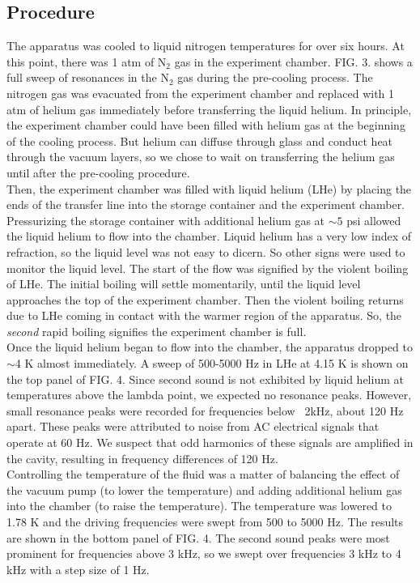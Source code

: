 \documentclass[prb,aps,twocolumn,showpacs,10pt]{revtex4-1}
\begin{document}
\subsection{Procedure}

The apparatus was cooled to liquid nitrogen temperatures for over six hours. At this point, there was 1 atm of N$_2$ gas in the experiment chamber. FIG. 3. shows a full sweep of resonances in the N$_2$ gas during the pre-cooling process. The nitrogen gas was evacuated from the experiment chamber and replaced with 1 atm of helium gas immediately before transferring the liquid helium. In principle, the experiment chamber could have been filled with helium gas at the beginning of the cooling process. But helium can diffuse through glass and conduct heat through the vacuum layers, so we chose to wait on transferring the helium gas until after the pre-cooling procedure.\\


Then, the experiment chamber was filled with liquid helium (LHe) by placing the ends of the transfer line into the storage container and the experiment chamber. Pressurizing the storage container with additional helium gas at $\sim 5$ psi allowed the liquid helium to flow into the chamber. Liquid helium has a very low index of refraction, so the liquid level was not easy to dicern. So other signs were used to monitor the liquid level. The start of the flow was signified by the violent boiling of LHe.  The initial boiling will settle momentarily, until the liquid level approaches the top of the experiment chamber. Then the violent boiling returns due to LHe coming in contact with the warmer region of the apparatus. So, the \textit{second} rapid boiling signifies the experiment chamber is full. \\

Once the liquid helium began to flow into the chamber, the apparatus dropped to $\sim$4 K almost immediately. A sweep of 500-5000 Hz in LHe at 4.15 K is shown on the top panel of FIG. 4. Since second sound is not exhibited by liquid helium at temperatures above the lambda point, we expected no resonance peaks. However, small resonance peaks were recorded for frequencies below ~2kHz, about 120 Hz apart. These peaks were attributed to noise from AC electrical signals that operate at 60 Hz. We suspect that odd harmonics of these signals are amplified in the cavity, resulting in frequency differences of 120 Hz. \\


Controlling the temperature of the fluid was a matter of balancing the effect of the vacuum pump (to lower the temperature) and adding additional helium gas into the chamber (to raise the temperature). The temperature was lowered to 1.78 K and the driving frequencies were swept from 500 to 5000 Hz. The results are shown in the bottom panel of FIG. 4. The second sound peaks were most prominent for frequencies above 3 kHz, so we swept over frequencies 3 kHz to 4 kHz with a step size of 1 Hz.
\end{document}
